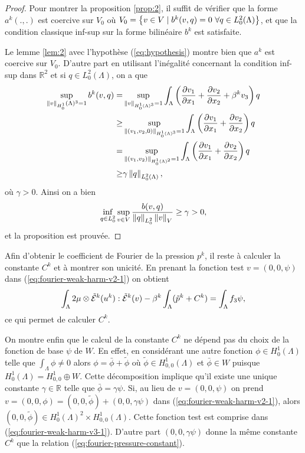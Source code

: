 \begin{proof}
  Pour montrer la proposition \ref{prop:2}, il suffit de vérifier
  que la forme $a^k(.,.)$ est coercive sur $V_0$ où $V_0 = \left\{ v
    \in V\mid b^k(v, q) = 0\ \forall q \in
    L^2_0(\Lambda) \right\}$, et que la condition classique inf-sup sur la forme
  bilinéaire $b^k$ est satisfaite.

  Le lemme \ref{lem:2} avec l'hypothèse (\ref{eq:hypothesis}) montre
  bien que $a^k$ est coercive sur $V_0$. D'autre part en utilisant
  l'inégalité concernant la condition inf-sup dans $\mathbb R^2$ et si
  $q\in L^2_0(\Lambda)$, on a que
  \begin{align*}
    \sup_{\left\lVert v \right\rVert_{H^1_0}(\Lambda)^3 = 1} b^k(v,q) = &\sup_{\left\lVert v \right\rVert_{H^1_0(\Lambda)^3} = 1} \int_{\Lambda}\left( \frac{\partial v_1}{\partial x_1} + \frac{\partial v_2}{\partial x_2} + \beta^k v_3 \right)q\\
    \geq & \sup_{\left\lVert (v_1, v_2, 0) \right\rVert_{H^1_0(\Lambda)^3} =
      1}\int_{\Lambda}\left( \frac{\partial v_1}{\partial x_1} +
      \frac{\partial v_2}{\partial x_2} \right)q\\
    = & \sup_{\left\lVert (v_1, v_2) \right\rVert_{H^1_0(\Lambda)^2} = 1}\int_{\Lambda}\left( \frac{\partial v_1}{\partial x_1} + \frac{\partial v_2}{\partial x_2} \right)q\\
    \geq& \gamma \left\lVert q \right\rVert_{L^2_0(\Lambda)},
  \end{align*}
  où $\gamma > 0$. Ainsi on a bien
  \begin{equation*}
    \inf_{q\in L^2_0}\sup_{v\in V} \frac{b(v,
      q)}{\left\lVert q \right\rVert_{L^2_0}\left\lVert v \right\rVert_{V}} \geq \gamma > 0,
  \end{equation*}
  et la proposition est prouvée.
\end{proof}

Afin d'obtenir le coefficient de Fourier de la pression $p^k$, il
reste à calculer la constante $C^k$ et à montrer son unicité. En
prenant la fonction test $v = (0,0,\psi)$ dans
(\ref{eq:fourier-weak-harm-v2-1}) on obtient
\begin{align}
\int_\Lambda 2\mu\otimes
\tilde{\mathcal E}^k(u^k):\tilde{\mathcal E}^k(v) -
\beta^k\int_\Lambda (\tilde p^k + C^k) = \int_\Lambda f_3 \psi, \label{eq:fourier-pressure-constant}
\end{align}
ce qui permet de calculer $C^k$.

On montre enfin que le calcul de la constante $C^k$ ne dépend pas du
choix de la fonction de base $\psi$ de $W$. En effet, en considérant
une autre fonction $\phi \in H^1_0(\Lambda)$ telle que $\int_\Lambda
\phi \neq 0$ alors $\phi = \bar\phi + \tilde \phi$ où $\tilde \phi \in
H^1_{0,0}(\Lambda)$ et $\bar \phi \in W$ puisque $H^1_0(\Lambda) =
H^1_{0,0} \oplus W$. Cette décomposition implique qu'il existe une
unique constante $\gamma \in \mathbb R$ telle que $\bar \phi = \gamma
\psi$. Si, au lieu de $v = (0,0,\psi)$ on prend $v = (0,0,\phi) =
(0,0,\tilde \phi) + (0,0,\gamma \psi)$ dans
(\ref{eq:fourier-weak-harm-v2-1}), alors $(0,0,\tilde \phi) \in
H^1_0(\Lambda)^2\times H^1_{0,0}(\Lambda)$. Cette fonction test est
comprise dans (\ref{eq:fourier-weak-harm-v3-1}). D'autre part
$(0,0,\gamma \psi)$ donne la même constante $C^k$ que la relation
(\ref{eq:fourier-pressure-constant}).

